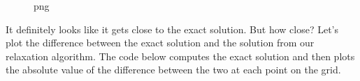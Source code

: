 \begin{figure}
\centering
{}
\caption{png}
\end{figure}

It definitely looks like it gets close to the exact solution. But how
close? Let's plot the difference between the exact solution and the
solution from our relaxation algorithm. The code below computes the
exact solution and then plots the absolute value of the difference
between the two at each point on the grid.

